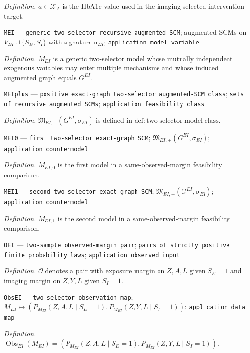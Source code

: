 \documentclass{article}
\begin{document}
\begin{itemize}
{{{{  \par\smallskip\noindent\emph{Definition.} \(a\in\mathcal X_A\) is the HbA1c value used in the imaging-selected intervention target.
  \item \texttt{MEI} --- \texttt{generic two-\allowbreak{}selector recursive augmented SCM}; augmented SCMs on \(V_{EI}\cup\{S_E,S_I\}\) with signature \(\sigma_{EI}\); \texttt{application model variable}
  \par\smallskip\noindent\emph{Definition.} \(M_{EI}\) is a generic two-selector model whose mutually independent exogenous variables may enter multiple mechanisms and whose induced augmented graph equals \(G^{EI}\).
  \item \texttt{MEIplus} --- \texttt{positive exact-\allowbreak{}graph two-\allowbreak{}selector augmented-\allowbreak{}SCM class}; \texttt{sets of recursive augmented SCMs}; \texttt{application feasibility class}
  \par\smallskip\noindent\emph{Definition.} \(\mathfrak M_{EI,+}(G^{EI},\sigma_{EI})\) is defined in \(\mathrm{def:two\text{-}selector\text{-}model\text{-}class}\).
  \item \texttt{MEI0} --- \texttt{first two-\allowbreak{}selector exact-\allowbreak{}graph SCM}; \(\mathfrak M_{EI,+}(G^{EI},\sigma_{EI})\); \texttt{application countermodel}
  \par\smallskip\noindent\emph{Definition.} \(M_{EI,0}\) is the first model in a same-observed-margin feasibility comparison.
  \item \texttt{MEI1} --- \texttt{second two-\allowbreak{}selector exact-\allowbreak{}graph SCM}; \(\mathfrak M_{EI,+}(G^{EI},\sigma_{EI})\); \texttt{application countermodel}
  \par\smallskip\noindent\emph{Definition.} \(M_{EI,1}\) is the second model in a same-observed-margin feasibility comparison.
  \item \texttt{OEI} --- \texttt{two-\allowbreak{}sample observed-\allowbreak{}margin pair}; \texttt{pairs of strictly positive finite probability laws}; \texttt{application observed input}
  \par\smallskip\noindent\emph{Definition.} \(\mathcal O\) denotes a pair with exposure margin on \(Z,A,L\) given \(S_E=1\) and imaging margin on \(Z,Y,L\) given \(S_I=1\).
  \item \texttt{ObsEI} --- \texttt{two-\allowbreak{}selector observation map}; \(M_{EI}\mapsto(P_{M_{EI}}(Z,A,L\mid S_E=1),P_{M_{EI}}(Z,Y,L\mid S_I=1))\); \texttt{application data map}
  \par\smallskip\noindent\emph{Definition.} \(\operatorname{Obs}_{EI}(M_{EI})=(P_{M_{EI}}(Z,A,L\mid S_E=1),P_{M_{EI}}(Z,Y,L\mid S_I=1))\).
}}}}
\end{itemize}
\end{document}
